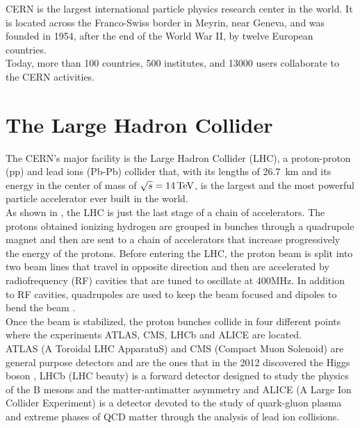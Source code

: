 \label{sec:CMS}
\minitoc

CERN is the largest international particle physics research center in the world. It is located across the Franco-Swiss border in Meyrin, near Geneva, and was founded in 1954, after the end of the World War II, by twelve European countries.\\
Today, more than 100 countries, 500 institutes, and 13000 users collaborate to the CERN activities.

\section{The Large Hadron Collider}
The CERN's major facility is the Large Hadron Collider (LHC), a proton-proton (pp) and lead ions (Pb-Pb) collider that, with its lengths of 26.7 km and its energy in the center of mass of $\sqrt{s}=14{\,\text{Te\hspace{-.08em}V}}$, is the largest and the most powerful particle accelerator ever built in the world.\\
As shown in , the LHC is just the last stage of a chain of accelerators. The protons obtained ionizing hydrogen are grouped in bunches through a quadrupole magnet and then are sent to a chain of accelerators that increase progressively the energy of the protons.
Before entering the LHC, the proton beam is split into two beam lines that travel in opposite direction and then are accelerated by radiofrequency (RF) cavities that are tuned to oscillate at 400MHz. In addition to RF cavities, quadrupoles are used to keep the beam focused and dipoles to bend the beam \cite{Bruning2004LHCReport}.\\
Once the beam is stabilized, the proton bunches collide in four different points where the experiments ATLAS, CMS, LHCb and ALICE are located.\\
ATLAS (A Toroidal LHC ApparatuS) and CMS (Compact Muon Solenoid) are general purpose detectors and are the ones that in the 2012 discovered the Higgs boson  \cite{Chatrchyan2012ObservationLHC,Aad2012ObservationLHC}, LHCb (LHC beauty) is a forward detector designed to study the physics of the B mesons and the matter-antimatter asymmetry and ALICE (A Large Ion Collider Experiment) is a detector devoted to the study of quark-gluon plasma and extreme phases of QCD matter through the analysis of lead ion collisions.
